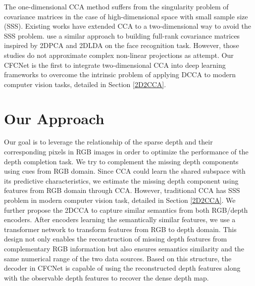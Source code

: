 \documentclass{article}
\begin{document}
The one-dimensional CCA method suffers from the singularity problem of covariance matrices in the case of high-dimensional space with small sample size (SSS). Existing works have extended CCA to a two-dimensional way to avoid the SSS problem. \cite{kukharev2010application,zou20072dcca,lee2007two} use a similar approach to building full-rank covariance matrices inspired by 2DPCA \cite{yang2004two} and 2DLDA \cite{li2004novel} on the face recognition task. However, those studies do not approximate complex non-linear projections as \cite{andrew2013deep, wang2015deep} attempt. Our CFCNet is the first to integrate two-dimensional CCA into deep learning frameworks to overcome the intrinsic problem of applying DCCA to modern computer vision tasks, detailed in Section \ref{2D2CCA}.

\section{Our Approach}
\label{approach}

Our goal is to leverage the relationship of the sparse depth and their corresponding pixels in RGB images in order to optimize the performance of the depth completion task. We try to complement the missing depth components using cues from RGB domain. Since CCA could learn the shared subspace with its predictive characteristics, we estimate the missing depth component using features from RGB domain through CCA. However, traditional CCA has SSS problem in modern computer vision task, detailed in Section \ref{2D2CCA}. We further propose the 2DCCA to capture similar semantics from both RGB/depth encoders. After encoders learning the semantically similar features, we use a transformer network to transform features from RGB to depth domain. This design not only enables the reconstruction of missing depth features from complementary RGB information but also ensures semantics similarity and the same numerical range of the two data sources. Based on this structure, the decoder in CFCNet is capable of using the reconstructed depth features along with the observable depth features to recover the dense depth map.
\end{document}

